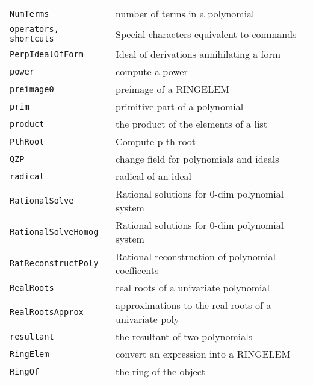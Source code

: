 \documentclass[a4paper]{mybook}
\begin{document}
\begin{center}
\begin{longtable}{ll}
{\verb~NumTerms~} &
      number of terms in a polynomial\\
   
{\verb~operators, shortcuts~} &
      Special characters equivalent to commands\\
   
{\verb~PerpIdealOfForm~} &
      Ideal of derivations annihilating a form\\
   
{\verb~power~} &
      compute a power\\
   
{\verb~preimage0~} &
      preimage of a RINGELEM\\
   
{\verb~prim~} &
      primitive part of a polynomial\\
   
{\verb~product~} &
      the product of the elements of a list\\
   
{\verb~PthRoot~} &
      Compute p-th root\\
   
{\verb~QZP~} &
      change field for polynomials and ideals\\
   
{\verb~radical~} &
      radical of an ideal\\
   
{\verb~RationalSolve~} &
      Rational solutions for 0-dim polynomial system\\
   
{\verb~RationalSolveHomog~} &
      Rational solutions for 0-dim polynomial system\\
   
{\verb~RatReconstructPoly~} &
      Rational reconstruction of polynomial coefficents\\
   
{\verb~RealRoots~} &
      real roots of a univariate polynomial\\
   
{\verb~RealRootsApprox~} &
      approximations to the real roots of a univariate poly\\
   
{\verb~resultant~} &
      the resultant of two polynomials\\
   
{\verb~RingElem~} &
      convert an expression into a RINGELEM\\
   
{\verb~RingOf~} &
      the ring of the object\\
   

\end{longtable}
\end{center}
\end{document}
